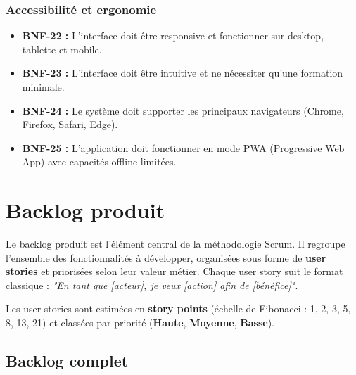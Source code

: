 \subsubsection{Accessibilité et ergonomie}

\begin{itemize}
    \item \textbf{BNF-22 :} L'interface doit être responsive et fonctionner sur desktop, tablette et mobile.
    
    \item \textbf{BNF-23 :} L'interface doit être intuitive et ne nécessiter qu'une formation minimale.
    
    \item \textbf{BNF-24 :} Le système doit supporter les principaux navigateurs (Chrome, Firefox, Safari, Edge).
    
    \item \textbf{BNF-25 :} L'application doit fonctionner en mode PWA (Progressive Web App) avec capacités offline limitées.
\end{itemize}

\section{Backlog produit}

Le backlog produit est l'élément central de la méthodologie Scrum. Il regroupe l'ensemble des fonctionnalités à développer, organisées sous forme de \textbf{user stories} et priorisées selon leur valeur métier. Chaque user story suit le format classique : \textit{"En tant que [acteur], je veux [action] afin de [bénéfice]"}.

Les user stories sont estimées en \textbf{story points} (échelle de Fibonacci : 1, 2, 3, 5, 8, 13, 21) et classées par priorité (\textbf{Haute}, \textbf{Moyenne}, \textbf{Basse}).

\subsection{Backlog complet}

